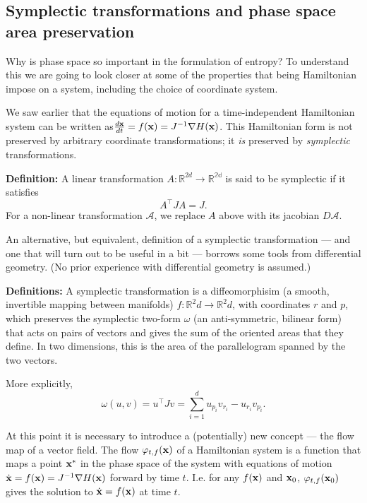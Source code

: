 \documentclass{article}
\begin{document}
\subsection*{Symplectic transformations and phase space area preservation}
Why is phase space so important in the formulation of entropy? To understand this we are going to look closer at some of the properties that being Hamiltonian impose on a system, including the choice of coordinate system.

We saw earlier that the equations of motion for a time-independent Hamiltonian system can be written as$ \frac{d{\bf x}}{dt} = f({\bf x}) = J^{-1}\nabla H({\bf x})$. This Hamiltonian form is not preserved by arbitrary coordinate transformations; it \emph{is} preserved by \emph{symplectic} transformations.

{\bf Definition:} A linear transformation $A: \mathbb{R}^{2d}\rightarrow\mathbb{R^{2d}}$ is said to be symplectic if it satisfies
$$ A^\top J A = J.$$
For a non-linear transformation $\mathcal{A}$, we replace $A$ above with its jacobian $D\mathcal{A}$.

An alternative, but equivalent, definition of a symplectic transformation --- and one that will turn out to be useful in a bit --- borrows some tools from differential geometry. (No prior experience with differential geometry is assumed.)

{\bf Definitions:} A symplectic transformation is a diffeomorphisim (a smooth, invertible mapping between manifolds) $f:\mathbb{R}^2d\rightarrow\mathbb{R}^2d$, with coordinates $r$ and $p$, which preserves the symplectic two-form $\omega$ (an anti-symmetric, bilinear form) that acts on pairs of vectors and gives the sum of the oriented areas that they define. In two dimensions, this is the area of the parallelogram spanned by the two vectors.

More explicitly,
\begin{equation*}
	\omega(u,v) = u^\top Jv = \sum_{i=1}^d u_{p_i} v_{r_i} - u_{r_i} v_{p_i}.
\end{equation*}

At this point it is necessary to introduce a (potentially) new concept --- the flow map of a vector field. The flow $\varphi_{t,f}({\bf x})$ of a Hamiltonian system is a function that maps a point ${\bf x}^*$ in the phase space of the system with equations of motion $\dot{\bf x} = f({\bf x}) =J^{-1}\nabla H({\bf x})$ forward by time $t$. I.e. for any $f({\bf x})$ and ${\bf x}_0$, $\varphi_{t,f}({\bf x}_0)$ gives the solution to $\dot{\bf x}=f({\bf x})$ at time $t$.
\end{document}
